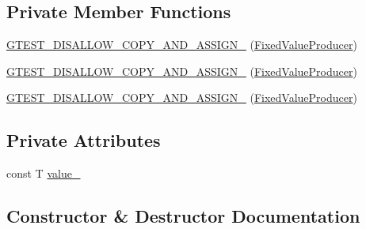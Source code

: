 \subsection*{Private Member Functions}
\begin{DoxyCompactItemize}
\item 
\mbox{\hyperlink{classtesting_1_1_default_value_1_1_fixed_value_producer_aeadb3fbaf90b8a20612b124a39809e30}{G\+T\+E\+S\+T\+\_\+\+D\+I\+S\+A\+L\+L\+O\+W\+\_\+\+C\+O\+P\+Y\+\_\+\+A\+N\+D\+\_\+\+A\+S\+S\+I\+G\+N\+\_\+}} (\mbox{\hyperlink{classtesting_1_1_default_value_1_1_fixed_value_producer}{Fixed\+Value\+Producer}})
\item 
\mbox{\hyperlink{classtesting_1_1_default_value_1_1_fixed_value_producer_aeadb3fbaf90b8a20612b124a39809e30}{G\+T\+E\+S\+T\+\_\+\+D\+I\+S\+A\+L\+L\+O\+W\+\_\+\+C\+O\+P\+Y\+\_\+\+A\+N\+D\+\_\+\+A\+S\+S\+I\+G\+N\+\_\+}} (\mbox{\hyperlink{classtesting_1_1_default_value_1_1_fixed_value_producer}{Fixed\+Value\+Producer}})
\item 
\mbox{\hyperlink{classtesting_1_1_default_value_1_1_fixed_value_producer_aeadb3fbaf90b8a20612b124a39809e30}{G\+T\+E\+S\+T\+\_\+\+D\+I\+S\+A\+L\+L\+O\+W\+\_\+\+C\+O\+P\+Y\+\_\+\+A\+N\+D\+\_\+\+A\+S\+S\+I\+G\+N\+\_\+}} (\mbox{\hyperlink{classtesting_1_1_default_value_1_1_fixed_value_producer}{Fixed\+Value\+Producer}})
\end{DoxyCompactItemize}
\subsection*{Private Attributes}
\begin{DoxyCompactItemize}
\item 
const T \mbox{\hyperlink{classtesting_1_1_default_value_1_1_fixed_value_producer_a54b7bf74121bd34319ebbe80e1aaa190}{value\+\_\+}}
\end{DoxyCompactItemize}


\subsection{Constructor \& Destructor Documentation}
\mbox{\label{classtesting_1_1_default_value_1_1_fixed_value_producer_a694f403694251385d385587b61a4ac95}} 
